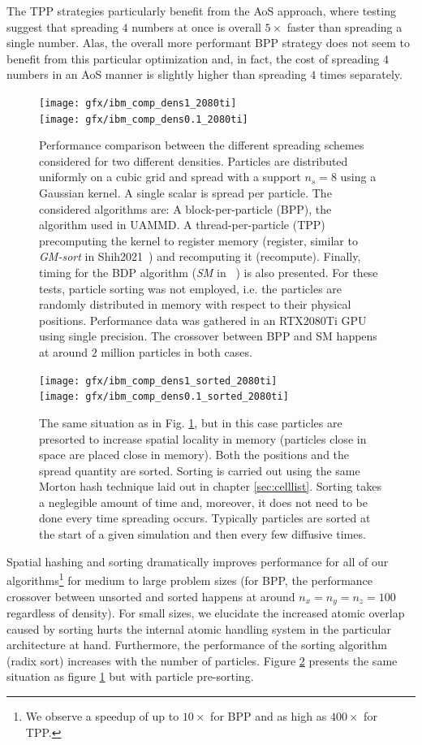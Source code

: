\documentclass[ twoside,openright,titlepage,numbers=noenddot,%
headinclude,footinclude,cleardoublepage=empty,abstract=on,
BCOR=5mm,paper=b5,fontsize=11pt, dvipsnames
]{scrreprt}
\newcommand{\uammd}{\gls{UAMMD}\xspace}
\newcommand{\gpu}{\gls{GPU}\xspace}
\begin{document}
The TPP strategies particularly benefit from the AoS approach, where testing suggest that spreading $4$ numbers at once is overall $5\times$ faster than spreading a single number. Alas, the overall more performant BPP strategy does not seem to benefit from this particular optimization and, in fact, the cost of spreading $4$ numbers in an AoS manner is slightly higher than spreading $4$ times separately.
\begin{figure}
  \centering
  \texttt{[image: gfx/ibm\_comp\_dens1\_2080ti]}\\
  \texttt{[image: gfx/ibm\_comp\_dens0.1\_2080ti]}
\caption{Performance comparison between the different spreading schemes considered for two different densities. Particles are distributed uniformly on a cubic grid and spread with a support $n_s=8$ using a Gaussian kernel. A single scalar is spread per particle. The considered algorithms are: A block-per-particle (BPP), the algorithm used in \uammd. A thread-per-particle (TPP) precomputing the kernel to register memory (register, similar to \emph{GM-sort} in Shih2021~\cite{Shih2021}) and recomputing it (recompute). Finally, timing for the BDP algorithm (\emph{SM} in ~\cite{Shih2021}) is also presented. For these tests, particle sorting was not employed, i.e. the particles are randomly distributed in memory with respect to their physical positions. Performance data was gathered in an RTX2080Ti \gpu using single precision. The crossover between BPP and SM happens at around $2$ million particles in both cases.}
\label{fig:ibmcomp}
\end{figure}

\begin{figure}
  \centering
  \texttt{[image: gfx/ibm\_comp\_dens1\_sorted\_2080ti]}\\
  \texttt{[image: gfx/ibm\_comp\_dens0.1\_sorted\_2080ti]}
\caption{The same situation as in Fig. \ref{fig:ibmcomp}, but in this case particles are presorted to increase spatial locality in memory (particles close in space are placed close in memory). Both the positions and the spread quantity are sorted. Sorting is carried out using the same Morton hash technique laid out in chapter \ref{sec:celllist}. Sorting takes a neglegible amount of time and, moreover, it does not need to be done every time spreading occurs. Typically particles are sorted at the start of a given simulation and then every few diffusive times.}
\label{fig:ibmcompsorted}
\end{figure}

Spatial hashing and sorting dramatically improves performance for all of our algorithms\footnote{We observe a speedup of up to $10\times $ for BPP and as high as $400\times $ for TPP.} for medium to large problem sizes (for BPP, the performance crossover between unsorted and sorted happens at around $n_x=n_y=n_z=100$ regardless of density). For small sizes, we elucidate the increased atomic overlap caused by sorting hurts the internal atomic handling system in the particular architecture at hand. Furthermore, the performance of the sorting algorithm (radix sort) increases with the number of particles. Figure \ref{fig:ibmcompsorted} presents the same situation as figure \ref{fig:ibmcomp} but with particle pre-sorting.
\end{document}
